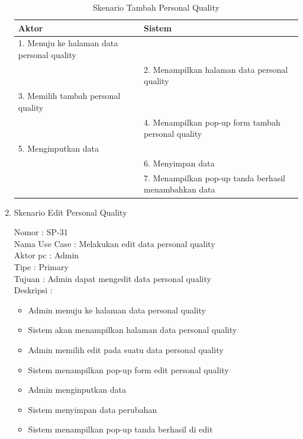 \begin{enumerate}
\begin{table}
	\caption{Skenario Tambah Personal Quality}
	\centering
	\begin{tabular}{ | l | p{54.5mm} |}
		\hline 
		\textbf{Aktor} & \textbf{Sistem} \\
		\hline
		
		1.	Menuju ke halaman data personal quality &  \\
		
		\hline
		
		&  2.	Menampilkan halaman data personal quality \\
		
		\hline
		
		3. Memilih tambah personal quality & \\
		
		\hline
		
		& 4.	Menampilkan pop-up form tambah personal quality \\
		
		\hline
		
		5.	Menginputkan data  & \\
		\hline
		
		& 6.	Menyimpan data \\
		\hline
		
		& 7.	Menampilkan pop-up tanda berhasil menambahkan data \\
		\hline
		
	\end{tabular}
\end{table}

\item Skenario Edit Personal Quality

Nomor \kern 3.6pc : SP-31 \\
Nama Use Case : Melakukan edit data personal quality \\
Aktor  pc : Admin \\
Tipe \kern 4.6pc : Primary \\
Tujuan \kern 3.6pc : Admin dapat mengedit data personal quality \\
Deskripsi \kern 2.5pc : 

\begin{itemize}
	\item Admin menuju ke halaman data personal quality
	\item Sistem akan menampilkan halaman data personal quality
	\item Admin memilih edit pada suatu data personal quality
	\item Sistem menampilkan pop-up form edit personal quality
	\item Admin menginputkan data
	\item Sistem menyimpan data perubahan
	\item Sistem menampilkan pop-up tanda berhasil di edit
	

\end{itemize}
\end{enumerate}
